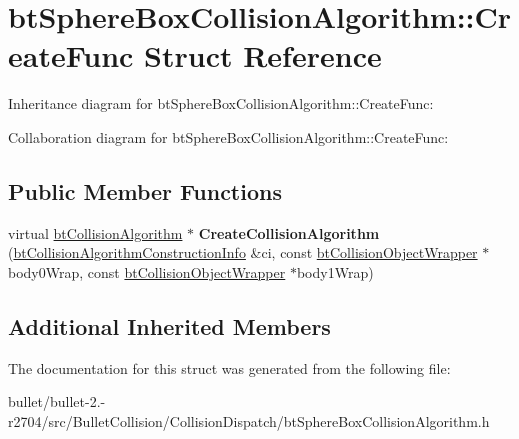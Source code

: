 \hypertarget{structbt_sphere_box_collision_algorithm_1_1_create_func}{\section{bt\+Sphere\+Box\+Collision\+Algorithm\+:\+:Create\+Func Struct Reference}
\label{structbt_sphere_box_collision_algorithm_1_1_create_func}
}


Inheritance diagram for bt\+Sphere\+Box\+Collision\+Algorithm\+:\+:Create\+Func\+:


Collaboration diagram for bt\+Sphere\+Box\+Collision\+Algorithm\+:\+:Create\+Func\+:
\subsection*{Public Member Functions}
\begin{DoxyCompactItemize}
\item 
\hypertarget{structbt_sphere_box_collision_algorithm_1_1_create_func_a9b840f1c69eb28d91b0cf8dbc6453d09}{virtual \hyperlink{classbt_collision_algorithm}{bt\+Collision\+Algorithm} $\ast$ {\bfseries Create\+Collision\+Algorithm} (\hyperlink{structbt_collision_algorithm_construction_info}{bt\+Collision\+Algorithm\+Construction\+Info} \&ci, const \hyperlink{structbt_collision_object_wrapper}{bt\+Collision\+Object\+Wrapper} $\ast$body0\+Wrap, const \hyperlink{structbt_collision_object_wrapper}{bt\+Collision\+Object\+Wrapper} $\ast$body1\+Wrap)}\label{structbt_sphere_box_collision_algorithm_1_1_create_func_a9b840f1c69eb28d91b0cf8dbc6453d09}

\end{DoxyCompactItemize}
\subsection*{Additional Inherited Members}


The documentation for this struct was generated from the following file\+:\begin{DoxyCompactItemize}
\item 
bullet/bullet-\/2.-\/r2704/src/\+Bullet\+Collision/\+Collision\+Dispatch/bt\+Sphere\+Box\+Collision\+Algorithm.\+h\end{DoxyCompactItemize}
